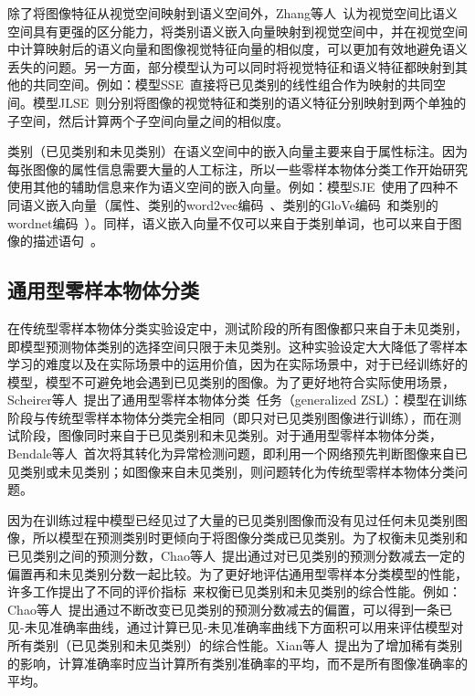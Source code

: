 除了将图像特征从视觉空间映射到语义空间外，Zhang等人~\cite{zhang2017learning}认为视觉空间比语义空间具有更强的区分能力，将类别语义嵌入向量映射到视觉空间中，并在视觉空间中计算映射后的语义向量和图像视觉特征向量的相似度，可以更加有效地避免语义丢失的问题。另一方面，部分模型认为可以同时将视觉特征和语义特征都映射到其他的共同空间。例如：模型SSE~\cite{zhang2015zero}直接将已见类别的线性组合作为映射的共同空间。模型JLSE~\cite{zhang2016zero}则分别将图像的视觉特征和类别的语义特征分别映射到两个单独的子空间，然后计算两个子空间向量之间的相似度。

类别（已见类别和未见类别）在语义空间中的嵌入向量主要来自于属性标注。因为每张图像的属性信息需要大量的人工标注，所以一些零样本物体分类工作开始研究使用其他的辅助信息来作为语义空间的嵌入向量。例如：模型SJE~\cite{akata2015evaluation}使用了四种不同语义嵌入向量（属性、类别的word2vec编码~\cite{mikolov2013distributed}、类别的GloVe编码~\cite{pennington2014glove}和类别的wordnet编码~\cite{miller1995wordnet}）。同样，语义嵌入向量不仅可以来自于类别单词，也可以来自于图像的描述语句~\cite{reed2016learning,lei2015predicting,elhoseiny2013write}。


\subsection{通用型零样本物体分类}
在传统型零样本物体分类实验设定中，测试阶段的所有图像都只来自于未见类别，即模型预测物体类别的选择空间只限于未见类别。这种实验设定大大降低了零样本学习的难度以及在实际场景中的运用价值，因为在实际场景中，对于已经训练好的模型，模型不可避免地会遇到已见类别的图像。为了更好地符合实际使用场景，Scheirer等人~\cite{scheirer2012toward}提出了通用型零样本物体分类~\cite{scheirer2012toward}任务（generalized ZSL）：模型在训练阶段与传统型零样本物体分类完全相同（即只对已见类别图像进行训练），而在测试阶段，图像同时来自于已见类别和未见类别。对于通用型零样本物体分类，Bendale等人~\cite{bendale2016towards}首次将其转化为异常检测问题，即利用一个网络预先判断图像来自已见类别或未见类别；如图像来自未见类别，则问题转化为传统型零样本物体分类问题。

因为在训练过程中模型已经见过了大量的已见类别图像而没有见过任何未见类别图像，所以模型在预测类别时更倾向于将图像分类成已见类别。为了权衡未见类别和已见类别之间的预测分数，Chao等人~\cite{chao2016empirical}提出通过对已见类别的预测分数减去一定的偏置再和未见类别分数一起比较。为了更好地评估通用型零样本分类模型的性能，许多工作提出了不同的评价指标~\cite{chao2016empirical,xian2018zero}来权衡已见类别和未见类别的综合性能。例如：Chao等人~\cite{chao2016empirical}提出通过不断改变已见类别的预测分数减去的偏置，可以得到一条已见-未见准确率曲线，通过计算已见-未见准确率曲线下方面积可以用来评估模型对所有类别（已见类别和未见类别）的综合性能。Xian等人~\cite{xian2018zero}提出为了增加稀有类别的影响，计算准确率时应当计算所有类别准确率的平均，而不是所有图像准确率的平均。

